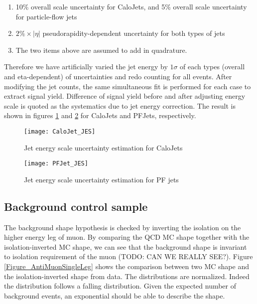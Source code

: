 \documentclass{cmspaper}
\begin{document}
\begin{enumerate}
\item 10\% overall scale uncertainty for CaloJets, and 5\% overall scale uncertainty for particle-flow jets
\item $2\% \times |\eta|$ pseudorapidity-dependent uncertainty for both types of jets
\item The two items above are assumed to add in quadrature.
\end{enumerate}

Therefore we have artificially varied the jet energy by $1 \sigma$ of each types (overall and eta-dependent) of uncertainties and redo counting for all events.
After modifying the jet counts, the same simultaneous fit is performed for each case to extract signal yield.
Difference of signal yield before and after adjusting energy scale is quoted as the systematics due to jet energy correction.
The result is shown in figures \ref{Figure_CaloJetJES} and \ref{Figure_PFJetJES} for CaloJets and PFJets, respectively.

\begin{figure}[hbtp]
\begin{center}
\texttt{[image: CaloJet\_JES]}
\caption{Jet energy scale uncertainty estimation for CaloJets}
\label{Figure_CaloJetJES}
\end{center}
\end{figure}

\begin{figure}[hbtp]
\begin{center}
\texttt{[image: PFJet\_JES]}
\caption{Jet energy scale uncertainty estimation for PF jets}
\label{Figure_PFJetJES}
\end{center}
\end{figure}


\subsection{Background control sample}

The background shape hypothesis is checked by inverting the isolation on the higher energy leg of muon.
By comparing the QCD MC shape together with the isolation-inverted MC shape,
we can see that the background shape is invariant to isolation requirement of the muon (TODO: CAN WE REALLY SEE?).
Figure \ref{Figure_AntiMuonSingleLeg} shows the comparison between two MC shape and the isolation-inverted shape from data.
The distributions are normalized.
Indeed the distribution follows a falling distribution.
Given the expected number of background events, an exponential should be able to describe the shape.
\end{document}
